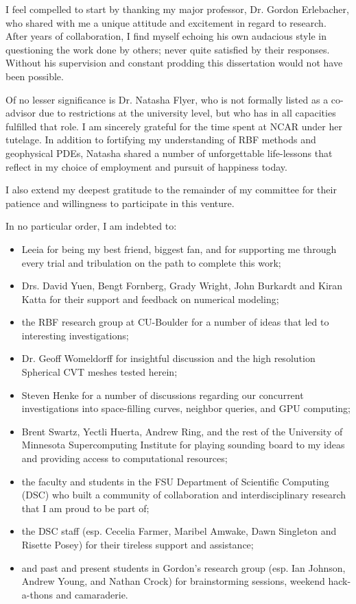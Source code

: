 \begin{acknowledgments}

I feel compelled to start by thanking my major professor, Dr. Gordon Erlebacher, who shared with me a unique attitude and excitement in regard to research. After years of collaboration, I find myself echoing his own audacious style in questioning the work done by others; never quite satisfied by their responses. Without his supervision and constant prodding this dissertation would not have been possible. %

Of no lesser significance is Dr. Natasha Flyer, who is not formally listed as a co-advisor due to restrictions at the university level, but who has in all capacities fulfilled that role. I am sincerely grateful for the time spent at NCAR under her tutelage. In addition to fortifying my understanding of RBF methods and geophysical PDEs, Natasha shared a number of unforgettable life-lessons that reflect in my choice of employment and pursuit of happiness today. 

I also extend my deepest gratitude to the remainder of my committee for their patience and willingness to participate in this venture. 

In no particular order, I am indebted to:
\begin{itemize}
\item Leeia for being my best friend, biggest fan, and for supporting me through every trial and tribulation on the path to complete this work;
\item Drs. David Yuen, Bengt Fornberg, Grady Wright, John Burkardt and Kiran Katta for their support and feedback on numerical modeling;
\item the RBF research group at CU-Boulder for a number of ideas that led to interesting investigations;
\item Dr. Geoff Womeldorff for insightful discussion and the high resolution Spherical CVT meshes tested herein;
\item Steven Henke for a number of discussions regarding our concurrent investigations into space-filling curves, neighbor queries, and GPU computing;
\item Brent Swartz, Yectli Huerta, Andrew Ring, and the rest of the University of Minnesota Supercomputing Institute for playing sounding board to my ideas and providing access to computational resources;
\item the faculty and students in the FSU Department of Scientific Computing (DSC) who built a community of collaboration and interdisciplinary research that I am proud to be part of;
\item the DSC staff (esp. Cecelia Farmer, Maribel Amwake, Dawn Singleton and Risette Posey) for their tireless support and assistance;  
\item and past and present students in Gordon's research group (esp. Ian Johnson, Andrew Young, and Nathan Crock) for brainstorming sessions, weekend hack-a-thons and camaraderie.
\end{itemize}


\end{acknowledgments}
